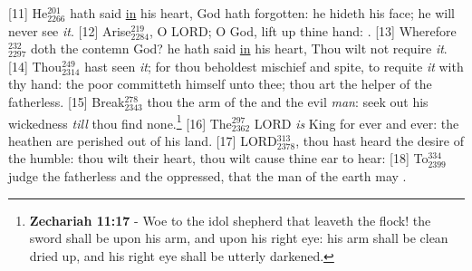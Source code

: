 [11] \textcolor[cmyk]{0.99998,1,0,0}{He\textcolor{jungle}{$_{2266}^{201}$} hath said \underline{in} his heart, God hath forgotten: he hideth his face; he will never see \emph{it}.}
[12] \textcolor[cmyk]{0.99998,1,0,0}{Arise\textcolor{jungle}{$_{2284}^{219}$}, O LORD; O God, lift up thine hand: .}
[13] \textcolor[cmyk]{0.99998,1,0,0}{Wherefore\textcolor{jungle}{$_{2297}^{232}$} doth the  contemn God? he hath said \underline{in} his heart, Thou wilt not require \emph{it}.}
[14] \textcolor[cmyk]{0.99998,1,0,0}{Thou\textcolor{jungle}{$_{2314}^{249}$} hast seen \emph{it}; for thou beholdest mischief and spite, to requite \emph{it} with thy hand: the poor committeth himself unto thee; thou art the helper of the fatherless.}
[15] \textcolor[cmyk]{0.99998,1,0,0}{Break\textcolor{jungle}{$_{2343}^{278}$} thou the arm of the  and the evil \emph{man}: seek out his wickedness \emph{till} thou find none.}\footnote{\textbf{Zechariah 11:17} -  Woe to the idol shepherd that leaveth the flock! the sword shall be upon his arm, and upon his right eye: his arm shall be clean dried up, and his right eye shall be utterly darkened.}
[16] \textcolor[cmyk]{0.99998,1,0,0}{The\textcolor{jungle}{$_{2362}^{297}$} LORD \emph{is} King for ever and ever: the heathen are perished out of his land.}
[17] \textcolor[cmyk]{0.99998,1,0,0}{LORD\textcolor{jungle}{$_{2378}^{313}$}, thou hast heard the desire of the humble: thou wilt  their heart, thou wilt cause thine ear to hear:}
[18] \textcolor[cmyk]{0.99998,1,0,0}{To\textcolor{jungle}{$_{2399}^{334}$} judge the fatherless and the oppressed, that the man of the earth may .}

